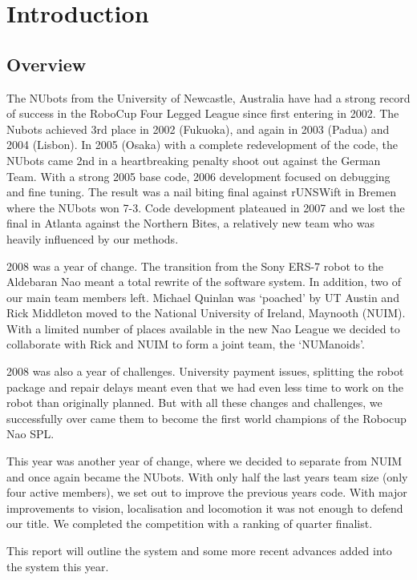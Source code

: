 \section{Introduction}

\subsection{Overview}

The NUbots from the University of Newcastle, Australia have had a strong record of success in the RoboCup Four Legged League since first entering in 2002. The Nubots achieved 3rd place in 2002 (Fukuoka), and again in 2003 (Padua) and 2004 (Lisbon). In 2005 (Osaka) with a complete redevelopment of the code, the NUbots came 2nd in a heartbreaking penalty shoot out against the German Team. With a strong 2005 base code, 2006 development focused on debugging and fine tuning. The result was a nail biting final against rUNSWift in Bremen where the NUbots won 7-3. Code development plateaued in 2007 and we lost the final in Atlanta against the Northern Bites, a relatively new team who was heavily influenced by our methods.  

2008 was a year of change. The transition from the Sony ERS-7 robot to the Aldebaran Nao meant a total rewrite of the software system. In addition, two of our main team members left. Michael Quinlan was `poached' by UT Austin and Rick Middleton moved to the National University of Ireland, Maynooth (NUIM). With a limited number of places available in the new Nao League we decided to collaborate with Rick and NUIM to form a joint team, the `NUManoids'. 

2008 was also a year of challenges. University payment issues, splitting the robot package and repair delays meant even that we had even less time to work on the robot than originally planned. But with all these changes and challenges, we successfully over came them to become the first world champions of the Robocup Nao SPL. 

This year was another year of change, where we decided to separate from NUIM and once again became the NUbots. With only half the last years team size (only four active members), we set out to improve the previous years code. With major improvements to vision, localisation and locomotion it was not enough to defend our title. We completed the competition with a ranking of quarter finalist.

This report will outline the system and some more recent advances added into the system this year.

